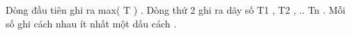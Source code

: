 Dòng đầu tiên ghi ra max( T ) . Dòng thứ 2 ghi ra dãy số T1 , T2 , .. Tn . Mỗi số ghi cách nhau ít nhất một dấu cách .  

\